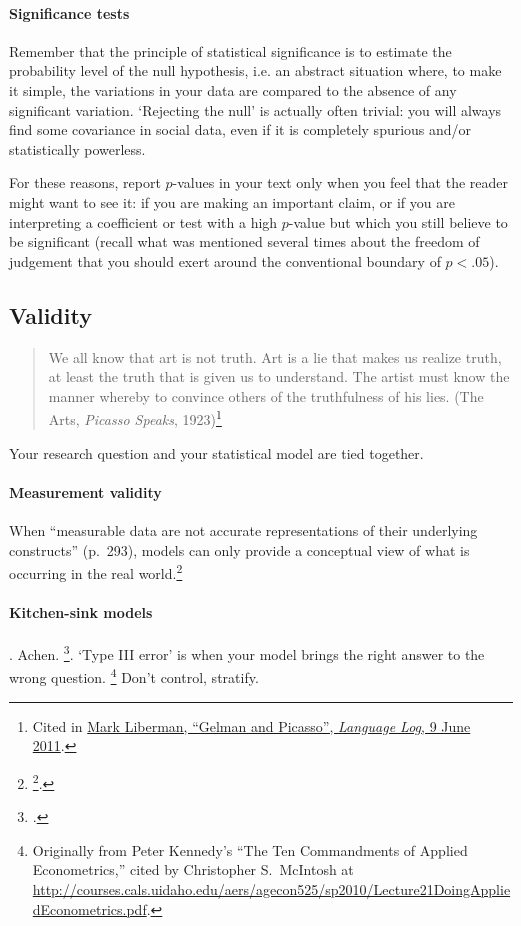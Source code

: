 \paragraph{Significance tests} Remember that the principle of statistical significance is to estimate the probability level of the null hypothesis, i.e. an abstract situation where, to make it simple, the variations in your data are compared to the absence of any significant variation. `Rejecting the null' is actually often trivial: you will always find some covariance in social data, even if it is completely spurious and/or statistically powerless.%

  For these reasons, report $p$-values in your text only when you feel that the reader might want to see it: if you are making an important claim, or if you are interpreting a coefficient or test with a high $p$-value but which you still believe to be significant (recall what was mentioned several times about the freedom of judgement that you should exert around the conventional boundary of $p < .05$).%

\subsection{Validity}

\begin{quote}
	We all know that art is not truth. Art is a lie that makes us realize truth, at least the truth that is given us to understand. The artist must know the manner whereby to convince others of the truthfulness of his lies. (The Arts, \emph{Picasso Speaks}, 1923)\footnote{Cited in \href{http://languagelog.ldc.upenn.edu/nll/?p=3103}{Mark Liberman, ``Gelman and Picasso'', \emph{Language Log}, 9 June 2011}.}
\end{quote}

Your research question and your statistical model are tied together. 

\paragraph{Measurement validity} When ``measurable data are not accurate representations of their underlying constructs'' (p.~293), models can only provide a conceptual view of what is occurring in the real world.\footnote{\href{http://projecteuclid.org/euclid.ss/1294167961}{\footcite{Shmueli:2010a}}.}

\paragraph{Kitchen-sink models}. Achen.  \href{http://polmeth.wustl.edu/mediaDetail.php?docId=1246}{\footcite{Schrodt:2011a}}. `Type III error' is when your model brings the right answer to the wrong question.%
     \footnote{Originally from Peter Kennedy's ``The Ten Commandments of Applied Econometrics,'' cited by Christopher S.~McIntosh at \url{http://courses.cals.uidaho.edu/aers/agecon525/sp2010/Lecture21DoingAppliedEconometrics.pdf}.} %
     Don't control, stratify.


